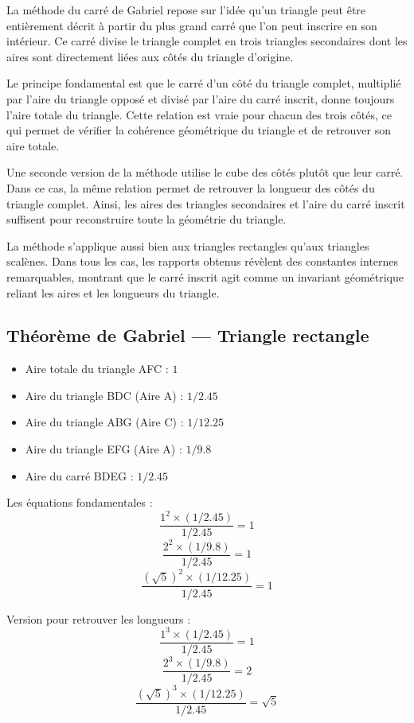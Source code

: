 \documentclass[12pt,a4paper]{article}
\begin{document}
La méthode du carré de Gabriel repose sur l’idée qu’un triangle peut être entièrement décrit à partir du plus grand carré que l’on peut inscrire en son intérieur. Ce carré divise le triangle complet en trois triangles secondaires dont les aires sont directement liées aux côtés du triangle d’origine.

Le principe fondamental est que le carré d’un côté du triangle complet, multiplié par l’aire du triangle opposé et divisé par l’aire du carré inscrit, donne toujours l’aire totale du triangle. Cette relation est vraie pour chacun des trois côtés, ce qui permet de vérifier la cohérence géométrique du triangle et de retrouver son aire totale.

Une seconde version de la méthode utilise le cube des côtés plutôt que leur carré. Dans ce cas, la même relation permet de retrouver la longueur des côtés du triangle complet. Ainsi, les aires des triangles secondaires et l’aire du carré inscrit suffisent pour reconstruire toute la géométrie du triangle.

La méthode s’applique aussi bien aux triangles rectangles qu’aux triangles scalènes. Dans tous les cas, les rapports obtenus révèlent des constantes internes remarquables, montrant que le carré inscrit agit comme un invariant géométrique reliant les aires et les longueurs du triangle.

\subsection*{Théorème de Gabriel — Triangle rectangle}

\begin{itemize}
    \item Aire totale du triangle AFC : $1$
    \item Aire du triangle BDC (Aire A) : $1/2.45$
    \item Aire du triangle ABG (Aire C) : $1/12.25$
    \item Aire du triangle EFG (Aire A) : $1/9.8$
    \item Aire du carré BDEG : $1/2.45$
\end{itemize}

Les équations fondamentales :
\[
\frac{1^2 \times (1/2.45)}{1/2.45} = 1
\]
\[
\frac{2^2 \times (1/9.8)}{1/2.45} = 1
\]
\[
\frac{(\sqrt{5})^2 \times (1/12.25)}{1/2.45} = 1
\]

Version pour retrouver les longueurs :
\[
\frac{1^3 \times (1/2.45)}{1/2.45} = 1
\]
\[
\frac{2^3 \times (1/9.8)}{1/2.45} = 2
\]
\[
\frac{(\sqrt{5})^3 \times (1/12.25)}{1/2.45} = \sqrt{5}
\]
\end{document}
